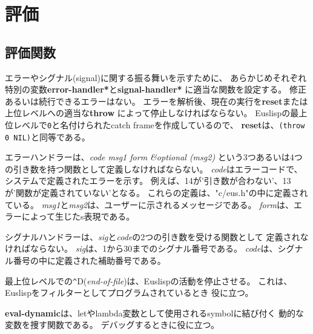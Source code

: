 \section{評価}

\subsection{評価関数}

エラーやシグナル(signal)に関する振る舞いを示すために、
あらかじめそれぞれ特別の変数{\bf *error-handler*}と{\bf *signal-handler*}
に適当な関数を設定する。
修正あるいは続行できるエラーはない。
エラーを解析後、現在の実行を{\bf reset}または上位レベルへの適当な{\bf throw}
によって停止しなければならない。
Euslispの最上位レベルで{\tt 0}と名付けられたcatch frameを作成しているので、
{\bf reset}は、{\tt (throw 0 NIL)}と同等である。

エラーハンドラーは、{\em code msg1 form \&optional (msg2)}
という3つあるいは4つの引き数を持つ関数として定義しなければならない。
{\em code}はエラーコードで、システムで定義されたエラーを示す。
例えば、14が'引き数が合わない'、13が'関数が定義されていない'となる。
これらの定義は、"c/eus.h"の中に定義されている。
{\em msg1}と{\em msg2}は、ユーザーに示されるメッセージである。
{\em form}は、エラーによって生じたs表現である。

シグナルハンドラーは、{\em sig}と{\em code}の2つの引き数を受ける関数として
定義されなければならない。
{\em sig}は、1から30までのシグナル番号である。
{\em code}は、シグナル番号の中に定義された補助番号である。

最上位レベルでの\verb+^+D({\em end-of-file})は、Euslispの活動を停止させる。
これは、Euslispをフィルターとしてプログラムされているとき
役に立つ。

{\bf eval-dynamic}は、letやlambda変数として使用されるsymbolに結び付く
動的な変数を捜す関数である。
デバッグするときに役に立つ。

